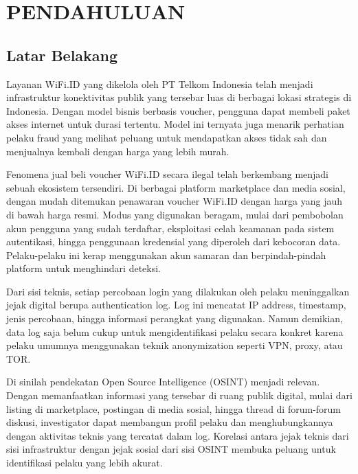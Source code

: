 \documentclass{ittelkom_ppi}
\begin{document}

\newpage
\normalsize
\tableofcontents

\newpage
\section{PENDAHULUAN}

\subsection{Latar Belakang} \label{background}
\justifying

Layanan WiFi.ID yang dikelola oleh PT Telkom Indonesia telah menjadi infrastruktur konektivitas publik yang tersebar luas di berbagai lokasi strategis di Indonesia. Dengan model bisnis berbasis voucher, pengguna dapat membeli paket akses internet untuk durasi tertentu. Model ini ternyata juga menarik perhatian pelaku fraud yang melihat peluang untuk mendapatkan akses tidak sah dan menjualnya kembali dengan harga yang lebih murah.

Fenomena jual beli voucher WiFi.ID secara ilegal telah berkembang menjadi sebuah ekosistem tersendiri. Di berbagai platform marketplace dan media sosial, dengan mudah ditemukan penawaran voucher WiFi.ID dengan harga yang jauh di bawah harga resmi. Modus yang digunakan beragam, mulai dari pembobolan akun pengguna yang sudah terdaftar, eksploitasi celah keamanan pada sistem autentikasi, hingga penggunaan kredensial yang diperoleh dari kebocoran data. Pelaku-pelaku ini kerap menggunakan akun samaran dan berpindah-pindah platform untuk menghindari deteksi.

Dari sisi teknis, setiap percobaan login yang dilakukan oleh pelaku meninggalkan jejak digital berupa authentication log. Log ini mencatat IP address, timestamp, jenis percobaan, hingga informasi perangkat yang digunakan. Namun demikian, data log saja belum cukup untuk mengidentifikasi pelaku secara konkret karena pelaku umumnya menggunakan teknik anonymization seperti VPN, proxy, atau TOR.

Di sinilah pendekatan Open Source Intelligence (OSINT) menjadi relevan. Dengan memanfaatkan informasi yang tersebar di ruang publik digital, mulai dari listing di marketplace, postingan di media sosial, hingga thread di forum-forum diskusi, investigator dapat membangun profil pelaku dan menghubungkannya dengan aktivitas teknis yang tercatat dalam log. Korelasi antara jejak teknis dari sisi infrastruktur dengan jejak sosial dari sisi OSINT membuka peluang untuk identifikasi pelaku yang lebih akurat.
\end{document}
